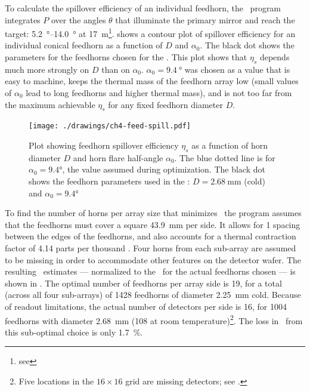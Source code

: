 To calculate the spillover efficiency of an individual feedhorn, the \MATLAB\ program integrates $P$ over the angles $\theta$ that illuminate the primary mirror and reach the target: \SIrange{5.2}{14.0}{\degree} at \SI{17}{\m}\footnote{see }.
 shows a contour plot of spillover efficiency for an individual conical feedhorn as a function of $D$ and $\alpha_0$.
The black dot shows the parameters for the feedhorns chosen for the \Imager.
This plot shows that $\eta_s$ depends much more strongly on $D$ than on $\alpha_0$.
$\alpha_0 = \SI{9.4}{\degree}$ was chosen as a value that is easy to machine, keeps the thermal mass of the feedhorn array low (small values of $\alpha_0$ lead to long feedhorns and higher thermal mass), and is not too far from the maximum achievable $\eta_s$ for any fixed feedhorn diameter $D$.

\begin{figure}
\centering
\texttt{[image: ./drawings/ch4-feed-spill.pdf]}
\caption[Feedhorn spillover efficiency]{
  Plot showing feedhorn spillover efficiency $\eta_s$ as a function of horn diameter $D$ and horn flare half-angle $\alpha_0$.
  The blue dotted line is for $\alpha_0 = \ang{9.4}$, the value assumed during optimization.
  The black dot shows the feedhorn parameters used in the \Imager: $D = \SI{2.68}{\mm}$ (cold) and $\alpha_0 = \ang{9.4}$
}
\label{fig:ch4-feed-spill}
\end{figure}

To find the number of horns per array size that minimizes \NETD\, the program assumes that the feedhorns must cover a square \SI{43.9}{\mm} per side.
It allows for \SI{1}{\mil} spacing between the edges of the feedhorns, and also accounts for a thermal contraction factor of 4.14 parts per thousand \cite[Appendix~A6.4]{ekin_experimental_2006}.
Four horns from each sub-array are assumed to be missing in order to accommodate other features on the detector wafer.
The resulting \NETD\ estimates --- normalized to the \NETD\ for the actual feedhorns chosen --- is shown in .
The optimal number of feedhorns per array side is 19, for a total (across all four sub-arrays) of 1428 feedhorns of diameter \SI{2.25}{\mm} cold.
Because of readout limitations, the actual number of detectors per side is 16, for 1004 feedhorns with diameter \SI{2.68}{\mm} (\SI{108}{\mils} at room temperature)\footnote{%
Five locations in the $16 \times 16$ grid are missing detectors; see .}.
The loss in \NETD\ from this sub-optimal choice is only \SI{1.7}{\percent}.

